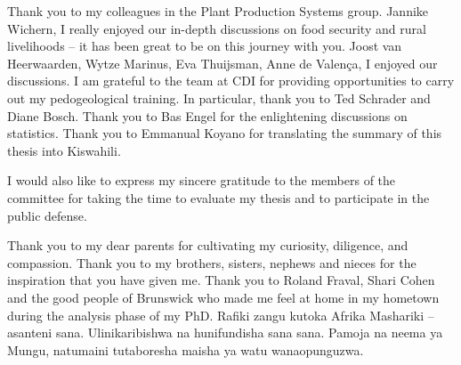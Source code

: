 Thank you to my colleagues in the Plant Production Systems group. Jannike Wichern, I really enjoyed our in-depth discussions on food security and rural livelihoods -- it has been great to be on this journey with you. Joost van Heerwaarden, Wytze Marinus, Eva Thuijsman, Anne de Valença, I enjoyed our discussions. I am grateful to the team at CDI for providing opportunities to carry out my pedogeological training. In particular, thank you to Ted Schrader and Diane Bosch. Thank you to Bas Engel for the enlightening discussions on statistics. Thank you to Emmanual Koyano for translating the summary of this thesis into Kiswahili. 

I would also like to express my sincere gratitude to the members of the committee for taking the time to evaluate my thesis and to participate in the public defense.

Thank you to my dear parents for cultivating my curiosity, diligence, and compassion. Thank you to my brothers, sisters, nephews and nieces for the inspiration that you have given me. Thank you to Roland Fraval, Shari Cohen and the good people of Brunswick who made me feel at home in my hometown during the analysis phase of my PhD. Rafiki zangu kutoka Afrika Mashariki -- asanteni sana. Ulinikaribishwa na hunifundisha sana sana. Pamoja na neema ya Mungu, natumaini tutaboresha maisha ya watu wanaopunguzwa.     


